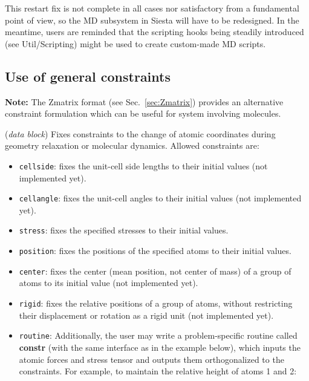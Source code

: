 \documentclass[11pt]{article}
\begin{document}
This restart fix is not complete in all cases nor satisfactory from a
fundamental point of view, so the MD subsystem in Siesta will have to
be redesigned. In the meantime, users are reminded that the scripting
hooks being steadily introduced (see Util/Scripting) might be used to
create custom-made MD scripts.


\subsection{Use of general constraints}

{\bf Note:} The Zmatrix format (see Sec.~\ref{sec:Zmatrix}) provides
an alternative constraint formulation which can be useful for system
involving molecules.

\begin{description}
\itemsep 10pt
\parsep 0pt

\item[{\bf GeometryConstraints}] ({\it data block})
Fixes constraints to the change of atomic coordinates during
geometry relaxation or molecular dynamics. Allowed constraints are:
\begin{itemize}
\item {\tt cellside}: fixes the unit-cell side lengths to
their initial values (not implemented yet).
\item {\tt cellangle}: fixes the unit-cell angles to
their initial values (not implemented yet).
\item {\tt stress}: fixes the specified stresses to
their initial values.
\item {\tt position}: fixes the positions of the specified atoms to
their initial values.
\item {\tt center}: fixes the center (mean position, not center of
mass) of a group of atoms to its initial value (not implemented yet).
\item {\tt rigid}: fixes the relative positions of a group of atoms,
without restricting their displacement or rotation as a rigid unit
(not implemented yet).
\item {\tt routine}: Additionally, the user may write a
problem-specific routine called {\bf constr} (with the same
interface as in the example below), which inputs the atomic
forces and stress tensor and outputs them orthogonalized to the
constraints. For example, to maintain the relative height of
atoms 1 and 2:


\end{itemize}
\end{description}
\end{document}
